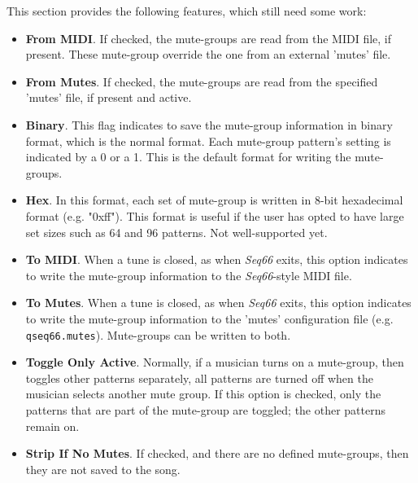    This section provides the following features, which still need some work:

      \begin{itemize}
         \item \textbf{From MIDI}.
            If checked, the mute-groups are read from the MIDI file, if
            present.  These mute-group override the one from an external
            'mutes' file.
         \item \textbf{From Mutes}.
            If checked, the mute-groups are read from the specified
            'mutes' file, if present and active.
         \item \textbf{Binary}.
            This flag indicates to save the mute-group information in
            binary format, which is the normal format.
            Each mute-group pattern's setting is indicated by a 0 or a 1.
            This is the default format for writing the mute-groups.
         \item \textbf{Hex}.
            In this format, each set of mute-group is written in 8-bit
            hexadecimal format (e.g. "0xff").  This format is useful if the
            user has opted to have large set sizes such as 64 and 96 patterns.
            Not well-supported yet.
         \item \textbf{To MIDI}.
            When a tune is closed, as when \textsl{Seq66} exits, this option
            indicates to write the mute-group information to the
            \textsl{Seq66}-style MIDI file.
         \item \textbf{To Mutes}.
            When a tune is closed, as when \textsl{Seq66} exits, this option
            indicates to write the mute-group information to the 'mutes'
            configuration file (e.g. \texttt{qseq66.mutes}).
            Mute-groups can be written to both.
         \item \textbf{Toggle Only Active}.
            Normally, if a musician turns on a mute-group, then toggles
            other patterns separately, all patterns are turned off
            when the musician selects another mute group.
            If this option is checked, only the patterns that are
            part of the mute-group are toggled; the other patterns remain
            on.
         \item \textbf{Strip If No Mutes}.
            If checked, and there are no defined mute-groups, then
            they are not saved to the song.
      \end{itemize}

